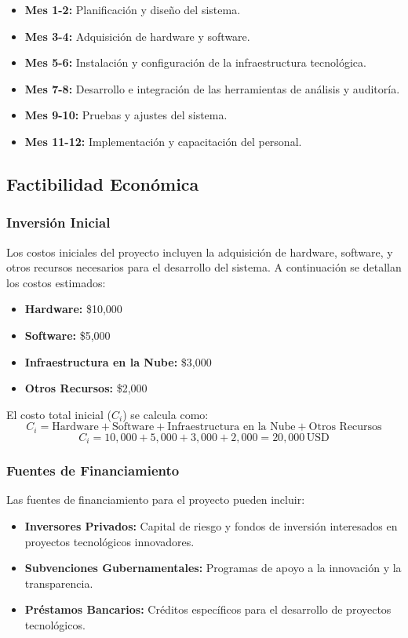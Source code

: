 \documentclass[a4paper,12pt]{article}
\begin{document}
\begin{itemize}
    \item \textbf{Mes 1-2:} Planificación y diseño del sistema.
    \item \textbf{Mes 3-4:} Adquisición de hardware y software.
    \item \textbf{Mes 5-6:} Instalación y configuración de la infraestructura tecnológica.
    \item \textbf{Mes 7-8:} Desarrollo e integración de las herramientas de análisis y auditoría.
    \item \textbf{Mes 9-10:} Pruebas y ajustes del sistema.
    \item \textbf{Mes 11-12:} Implementación y capacitación del personal.
\end{itemize}

\subsection{Factibilidad Económica}
\subsubsection{Inversión Inicial}
Los costos iniciales del proyecto incluyen la adquisición de hardware, software, y otros recursos necesarios para el desarrollo del sistema. A continuación se detallan los costos estimados:

\begin{itemize}
    \item \textbf{Hardware:} \$10,000
    \item \textbf{Software:} \$5,000
    \item \textbf{Infraestructura en la Nube:} \$3,000
    \item \textbf{Otros Recursos:} \$2,000
\end{itemize}

El costo total inicial (\(C_i\)) se calcula como:
\[
C_i = \text{Hardware} + \text{Software} + \text{Infraestructura en la Nube} + \text{Otros Recursos}
\]
\[
C_i = 10,000 + 5,000 + 3,000 + 2,000 = 20,000 \, \text{USD}
\]

\subsubsection{Fuentes de Financiamiento}
Las fuentes de financiamiento para el proyecto pueden incluir:

\begin{itemize}
    \item \textbf{Inversores Privados:} Capital de riesgo y fondos de inversión interesados en proyectos tecnológicos innovadores.
    \item \textbf{Subvenciones Gubernamentales:} Programas de apoyo a la innovación y la transparencia.
    \item \textbf{Préstamos Bancarios:} Créditos específicos para el desarrollo de proyectos tecnológicos.
\end{itemize}
\end{document}

